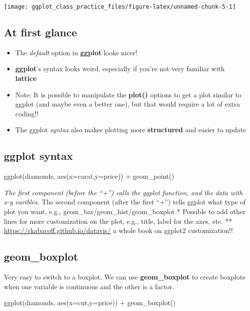 \documentclass[
]{article}
\newenvironment{Shaded}{\begin{snugshade}}{\end{snugshade}}
\newcommand{\AttributeTok}[1]{\textcolor[rgb]{0.77,0.63,0.00}{#1}}
\newcommand{\FunctionTok}[1]{\textcolor[rgb]{0.00,0.00,0.00}{#1}}
\newcommand{\NormalTok}[1]{#1}
\newcommand{\SpecialCharTok}[1]{\textcolor[rgb]{0.00,0.00,0.00}{#1}}
\providecommand{\tightlist}{%
  \setlength{\itemsep}{0pt}\setlength{\parskip}{0pt}}
\begin{document}
\begin{center}\texttt{[image: ggplot\_class\_practice\_files/figure-latex/unnamed-chunk-5-1]} \end{center}

\hypertarget{at-first-glance}{%
\subsection{At first glance}\label{at-first-glance}}

\begin{itemize}
\tightlist
\item
  The \emph{default} option in \textbf{ggplot} looks nicer!
\item
  \textbf{ggplot}'s syntax looks weird, especially if you're not very
  familiar with \textbf{lattice}
\item
  Note: It is possible to manipulate the \textbf{plot()} options to get
  a plot similar to ggplot (and maybe even a better one), but that would
  require a lot of extra coding!!
\item
  The ggplot \emph{syntax} also makes plotting more \textbf{structured}
  and easier to update
\end{itemize}

\hypertarget{ggplot-syntax}{%
\subsection{ggplot syntax}\label{ggplot-syntax}}

ggplot(diamonds, aes(x=carat,y=price)) + geom\_point()

\emph{The first component (before the ``+'') calls the ggplot function,
and the data with x-y varibles. } The second component (after the first
``+'') tells ggplot what type of plot you want, e.g.,
geom\_bar/geom\_hist/geom\_boxplot * Possible to add other lines for
more customization on the plot, e.g., title, label for the axes, etc. **
\url{https://rkabacoff.github.io/datavis/} a whole book on ggplot2
customization!!

\hypertarget{geom_boxplot}{%
\subsection{geom\_boxplot}\label{geom_boxplot}}

Very easy to switch to a boxplot. We can use \textbf{geom\_boxplot} to
create boxplots when one variable is continuous and the other is a
factor.

\begin{Shaded}
\begin{Highlighting}[]
\FunctionTok{ggplot}\NormalTok{(diamonds, }\FunctionTok{aes}\NormalTok{(}\AttributeTok{x=}\NormalTok{cut,}\AttributeTok{y=}\NormalTok{price)) }\SpecialCharTok{+} \FunctionTok{geom\_boxplot}\NormalTok{()}
\end{Highlighting}
\end{Shaded}
\end{document}
